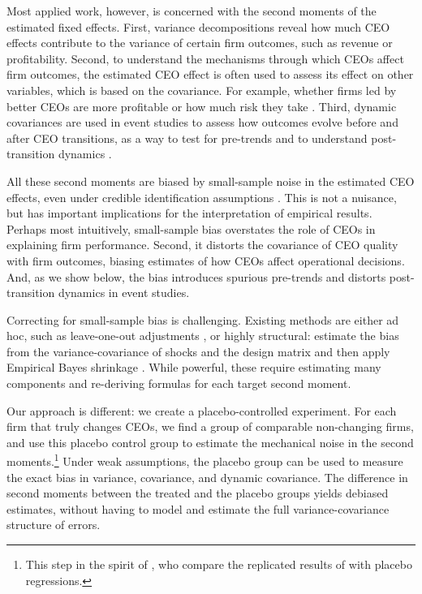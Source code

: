 \documentclass[11pt,a4paper]{article}
\begin{document}
Most applied work, however, is concerned with the second moments of the estimated fixed effects. First, variance decompositions reveal how much CEO effects contribute to the variance of certain firm outcomes, such as revenue or profitability. Second, to understand the mechanisms through which CEOs affect firm outcomes, the estimated CEO effect is often used to assess its effect on other variables, which is based on the covariance. For example, whether firms led by better CEOs are more profitable \citep{mackey2008effect} or how much risk they take \citep{schoar2024effect}. Third, dynamic covariances are used in event studies to assess how outcomes evolve before and after CEO transitions, as a way to test for pre-trends and to understand post-transition dynamics \citep{schoar2024effect}. 

All these second moments are biased by small-sample noise in the estimated CEO effects, even under credible identification assumptions \citep{andrews2008high,gaure2014correlation,Bonhomme2023-dx}. This is not a nuisance, but has important implications for the interpretation of empirical results. Perhaps most intuitively, small-sample bias overstates the role of CEOs in explaining firm performance. Second, it distorts the covariance of CEO quality with firm outcomes, biasing estimates of how CEOs affect operational decisions. And, as we show below, the bias introduces spurious pre-trends and distorts post-transition dynamics in event studies.

Correcting for small-sample bias is challenging. Existing methods are either ad hoc, such as leave-one-out adjustments \citep{kline2020leave}, or highly structural: estimate the bias from the variance-covariance of shocks and the design matrix and then apply Empirical Bayes shrinkage \citep{andrews2008high,Bonhomme2023-dx,kline2024firm}. While powerful, these require estimating many components and re-deriving formulas for each target second moment.

Our approach is different: we create a placebo-controlled experiment. For each firm that truly changes CEOs, we find a group of comparable non-changing firms, and use this placebo control group to estimate the mechanical noise in the second moments.\footnote{This step in the spirit of \cite{jarosiewicz2023revisiting}, who compare the replicated results of  \cite{Bertrand2003-io} with placebo regressions.} Under weak assumptions, the placebo group can be used to measure the exact bias in variance, covariance, and dynamic covariance. The difference in second moments between the treated and the placebo groups yields debiased estimates, without having to model and estimate the full variance-covariance structure of errors.
\end{document}
